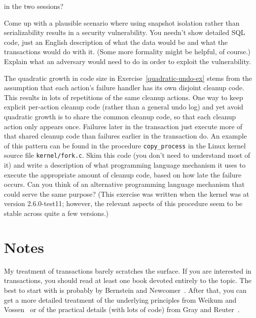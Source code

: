 \begin{chapterEnumerate}
in the two sessions?
\item
Come up with a plausible scenario where using snapshot isolation
rather than serializability results in a security vulnerability.  You
needn't show detailed SQL code, just an English description of what
the data would be and what the transactions would do with it.  (Some
more formality might be helpful, of course.)  Explain what an
adversary would need to do in order to exploit the vulnerability.
\item
\label{kernel-failure-atomicity-exercise}
The quadratic growth in code size in Exercise~\ref{quadratic-undo-ex} stems
from the assumption that each action's failure handler has its own disjoint
cleanup code.  This results in lots of repetitions of the same cleanup
actions.  One way to keep explicit per-action cleanup code (rather than a
general undo log) and yet avoid quadratic growth is to share the common
cleanup code, so that each cleanup action only appears once.  Failures later
in the transaction just execute more of that shared cleanup code than
failures earlier in the transaction do. An example of this pattern can
be found in the procedure \verb|copy_process| in the Linux kernel
source file \verb|kernel/fork.c|.  Skim this code (you don't need to
understand most of it) and write a description of what
programming language mechanism it uses to execute the appropriate
amount of cleanup code, based on how late the failure occurs.  Can you
think of an alternative programming language mechanism that could
serve the same purpose?  (This exercise was written when the kernel
was at version 2.6.0-test11; however, the relevant aspects of this
procedure seem to be stable across quite a few versions.)
\end{chapterEnumerate}

\section*{Notes}

My treatment of transactions barely scratches the surface.
If you are interested in transactions, you should read at
least one book devoted entirely to the topic.  The best to start with
is probably by Bernstein and
Newcomer~\cite{max1054}.  After that, you can
get a more detailed treatment of the underlying principles from
Weikum and Vossen~\cite{max1085}
or of the practical details (with lots of code) from 
Gray and Reuter~\cite{max1009}.

